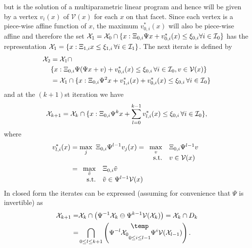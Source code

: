\documentclass[letterpaper, 10pt, conference]{ieeeconf} %
\newcommand{\bigominus}{\raisebox{10pt}{$\temp$}}
\begin{document}
but is the solution of a multiparametric linear program and hence will be given 
by a vertex $v_i(x)$ of $\mathcal V(x)$ for each $x$ on that facet.
Since each vertex is a piece-wise affine function of $x$, the maximum $v_{0,i}^\ast(x)$ will also
be piece-wise affine
and therefore the set $\mathcal X_1=\mathcal X_0 \cap \{x:\Xi_{0,i}\Psi x + v_{0,i}^\ast(x) \leq 
\xi_{0,i}\forall i\in\mathcal I_0\}$
has the representation $\mathcal X_1 = \{x:\Xi_{1,i}x\leq\xi_{1,i}\,\forall i\in\mathcal I_1\}$.
The next iterate is defined by
\begin{align*}
	\mathcal X_2 &= \mathcal X_1 \cap \\ &\{x:\Xi_{0,i}\Psi(\Psi x + v) + v_{0,i}^\ast(x)\leq\xi_{0,i}\,
	\forall i\in\mathcal I_0,v\in\mathcal V(x)\}\\
&= \mathcal X_1 \cap \{x: \Xi_{0,i}\Psi^2 x + v_{1,i}^\ast(x) + v_{0,i}^\ast(x)\leq\xi_{0,i}\,\forall 
	i\in\mathcal I_0\}
\end{align*}
%
and at the $(k+1)$st iteration we have
%
\[%
	\mathcal X_{k+1} = \mathcal X_k\cap \{x:\genmat_{0,i}\Psi^k x + \sum_{l=0}^{k-1}v_{l,i}^\ast(x)
	\leq\genvec_{0,i}\,\forall i\in\mathcal I_0\},
\]%
%
where 
%
\begin{align*}
	v_{l,i}^\ast(x)&=\max_j \ \genmat_{0,i}\Psi^{l-1}v_j(x)
	 = \begin{array}[t]{rl} \displaystyle\max_v & \genmat_{0,i}\Psi^{l-1}v \\ \text{s.t.}& v\in\mathcal V(x)\end{array} \\
	 &= \begin{array}[t]{rl} \displaystyle\max_{\tilde v} & \genmat_{0,i}\tilde v\\ \text{s.t.}& \tilde v\in \Psi^{l-1}\mathcal V(x) \end{array}
\end{align*}
%
In closed form the iterates can be expressed (assuming for convenience that $\Psi$ is invertible) as
%
\begin{equation}\label{eq:set:iteration:state:dependent:constraints}
\begin{split}
	\mathcal X_{k+1} =& \mathcal X_k\cap\left(\Psi^{-1}\mathcal X_k \ominus \Psi^{k-1}\mathcal V(\mathcal X_k)\right)
	=\mathcal X_k\cap D_k \\
	=& \bigcap_{0\leq l\leq k+1}\left( \Psi^{-l} \mathcal X_0 \underset{0 \leq i\leq l-1}{\bigominus} \Psi^i \mathcal V(\mathcal X_{l-1})\right).
\end{split}\end{equation}
\end{document}
